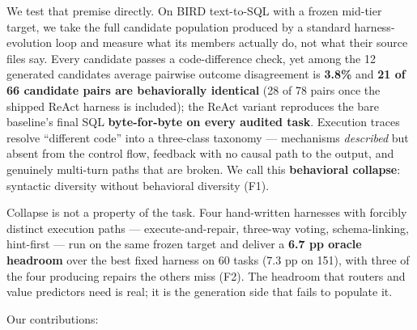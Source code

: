 We test that premise directly. On BIRD text-to-SQL with a frozen
mid-tier target, we take the full candidate population produced by a
standard harness-evolution loop and measure what its members actually
do, not what their source files say. Every candidate passes a
code-difference check, yet among the 12 generated candidates average
pairwise outcome disagreement is \textbf{3.8\%} and \textbf{21 of 66
candidate pairs are behaviorally identical} (28 of 78 pairs once the
shipped ReAct harness is included); the ReAct variant reproduces the
bare baseline's final SQL \textbf{byte-for-byte on every audited task}.
Execution traces resolve ``different code'' into a three-class taxonomy
--- mechanisms \emph{described} but absent from the control flow,
feedback with no causal path to the output, and genuinely multi-turn
paths that are broken. We call this \textbf{behavioral collapse}:
syntactic diversity without behavioral diversity (F1).

Collapse is not a property of the task. Four hand-written harnesses with
forcibly distinct execution paths --- execute-and-repair, three-way
voting, schema-linking, hint-first --- run on the same frozen target and
deliver a \textbf{6.7 pp oracle headroom} over the best fixed harness on
60 tasks (7.3 pp on 151), with three of the four producing repairs the
others miss (F2). The headroom that routers and value predictors need is
real; it is the generation side that fails to populate it.

Our contributions:
